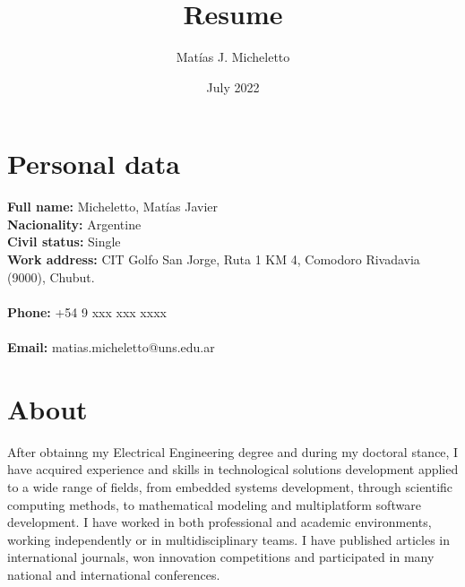 \documentclass[10pt]{article}
\title{\bfseries\huge Resume}
\author{\Large Matías J. Micheletto}
\date{July 2022}
\begin{document}
\maketitle

\section{Personal data}
\raggedright
\textbf{Full name:} Micheletto, Matías Javier \\
\textbf{Nacionality:} Argentine  \\
\textbf{Civil status:} Single \\
\textbf{Work address:}
\ifx\censorData\undefined
  	CIT Golfo San Jorge, Ruta 1 KM 4, Comodoro Rivadavia (9000), Chubut. \\
\else
	 \\
\fi
\textbf{Phone:}
\ifx\censorData\undefined
  	+54 9 xxx xxx xxxx \\
\else
	 \\
\fi
\textbf{Email:} matias.micheletto@uns.edu.ar \\

\section{About}
After obtainng my Electrical Engineering degree and during my doctoral stance, I have acquired experience and skills in technological solutions development applied to a wide range of fields, from embedded systems development, through scientific computing methods, to mathematical modeling and multiplatform software development. I have worked in both professional and academic environments, working independently or in multidisciplinary teams. I have published articles in international journals, won innovation competitions and participated in many national and international conferences.
\end{document}
